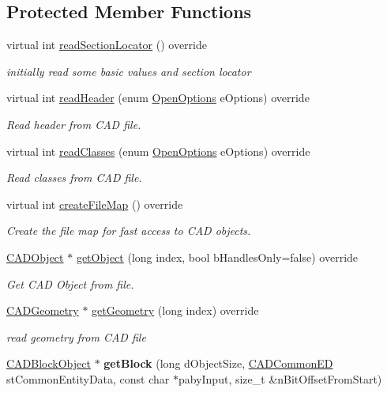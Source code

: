 \subsection*{Protected Member Functions}
\begin{DoxyCompactItemize}
\item 
virtual int \hyperlink{class_d_w_g_file_r2000_ab7e07561e251678368ffecdf6bcedf06}{read\+Section\+Locator} () override
\begin{DoxyCompactList}\small\item\em initially read some basic values and section locator \end{DoxyCompactList}\item 
virtual int \hyperlink{class_d_w_g_file_r2000_a6ffef545cd473a1f2a2639f2941e4946}{read\+Header} (enum \hyperlink{class_c_a_d_file_a4776c7f9fc5888cac0ee6eede900db5a}{Open\+Options} e\+Options) override
\begin{DoxyCompactList}\small\item\em Read header from C\+AD file. \end{DoxyCompactList}\item 
virtual int \hyperlink{class_d_w_g_file_r2000_a9c0571cdd77cbc3c67612ebf8cabeccb}{read\+Classes} (enum \hyperlink{class_c_a_d_file_a4776c7f9fc5888cac0ee6eede900db5a}{Open\+Options} e\+Options) override
\begin{DoxyCompactList}\small\item\em Read classes from C\+AD file. \end{DoxyCompactList}\item 
virtual int \hyperlink{class_d_w_g_file_r2000_a8ac0c8003944b948e3d1f16c713e8e27}{create\+File\+Map} () override
\begin{DoxyCompactList}\small\item\em Create the file map for fast access to C\+AD objects. \end{DoxyCompactList}\item 
\hyperlink{class_c_a_d_object}{C\+A\+D\+Object} $\ast$ \hyperlink{class_d_w_g_file_r2000_acf783d35f2fc64756d38a5cb30f4885f}{get\+Object} (long index, bool b\+Handles\+Only=false) override
\begin{DoxyCompactList}\small\item\em Get C\+AD Object from file. \end{DoxyCompactList}\item 
\hyperlink{class_c_a_d_geometry}{C\+A\+D\+Geometry} $\ast$ \hyperlink{class_d_w_g_file_r2000_a8838da9ee3111f5aba1451aa59528760}{get\+Geometry} (long index) override
\begin{DoxyCompactList}\small\item\em read geometry from C\+AD file \end{DoxyCompactList}\item 
\hyperlink{class_c_a_d_block_object}{C\+A\+D\+Block\+Object} $\ast$ {\bfseries get\+Block} (long d\+Object\+Size, \hyperlink{struct_c_a_d_common_e_d}{C\+A\+D\+Common\+ED} st\+Common\+Entity\+Data, const char $\ast$paby\+Input, size\+\_\+t \&n\+Bit\+Offset\+From\+Start)\hypertarget{class_d_w_g_file_r2000_aa64c4f2a792ef83f9a8ed2632a7421bd}{}\label{class_d_w_g_file_r2000_aa64c4f2a792ef83f9a8ed2632a7421bd}


\end{DoxyCompactItemize}
